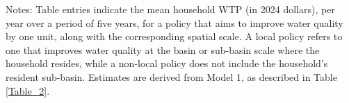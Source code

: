 \begin{table}[!ht]
\caption{Willingness to pay for a one-unit improvement in water quality}
\label{Table_3}
{}
\vspace{0.2em}

\small
Notes: Table entries indicate the mean household WTP (in 2024 dollars), per year over a period of five years, for a policy that aims to improve water quality by one unit, along with the corresponding spatial scale. A local policy refers to one that improves water quality at the basin or sub-basin scale where the household resides, while a non-local policy does not include the household’s resident sub-basin. Estimates are derived from Model 1, as described in Table \ref{Table_2}.
\end{table}
